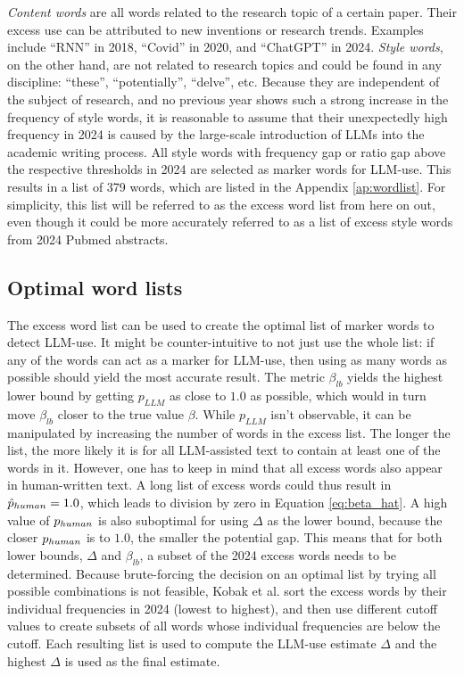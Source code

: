\emph{Content words} are all words related to the research topic of a certain paper. 
Their excess use can be attributed to new inventions or research trends.
Examples include ``RNN'' in 2018, ``Covid'' in 2020, and ``ChatGPT'' in 2024.
\emph{Style words}, on the other hand, are not related to research topics and could be found in any discipline: ``these'', ``potentially'', ``delve'', etc.
Because they are independent of the subject of research, and no previous year shows such a strong increase in the frequency of style words, it is reasonable to assume that their unexpectedly high frequency in 2024 is caused by the large-scale introduction of LLMs into the academic writing process.
All style words with frequency gap or ratio gap above the respective thresholds in 2024 are selected as marker words for LLM-use.
This results in a list of 379 words, which are listed in the Appendix \ref{ap:wordlist}.
For simplicity, this list will be referred to as the excess word list from here on out, even though it could be more accurately referred to as a list of excess style words from 2024 Pubmed abstracts.

\subsection{Optimal word lists}
The excess word list can be used to create the optimal list of marker words to detect LLM-use.
It might be counter-intuitive to not just use the whole list: if any of the words can act as a marker for LLM-use, then using as many words as possible should yield the most accurate result.
The metric $\beta_{lb}$ yields the highest lower bound by getting $p_{LLM}$ as close to $1.0$ as possible, which would in turn move $\beta_{lb}$ closer to the true value $\beta$.
While $p_{LLM}$ isn't observable, it can be manipulated by increasing the number of words in the excess list.
The longer the list, the more likely it is for all LLM-assisted text to contain at least one of the words in it.
However, one has to keep in mind that all excess words also appear in human-written text.
A long list of excess words could thus result in $\hat{p}_{human} = 1.0$, which leads to division by zero in Equation \ref{eq:beta_hat}.
A high value of $p_{human}$ is also suboptimal for using $\Delta$ as the lower bound, because the closer $p_{human}$ is to $1.0$, the smaller the potential gap.
This means that for both lower bounds, $\Delta$ and $\beta_{lb}$, a subset of the 2024 excess words needs to be determined.
Because brute-forcing the decision on an optimal list by trying all possible combinations is not feasible, Kobak et al. sort the excess words by their individual frequencies in 2024 (lowest to highest), and then use different cutoff values to create subsets of all words whose individual frequencies are below the cutoff. 
Each resulting list is used to compute the LLM-use estimate $\Delta$ and the highest $\Delta$ is used as the final estimate.

